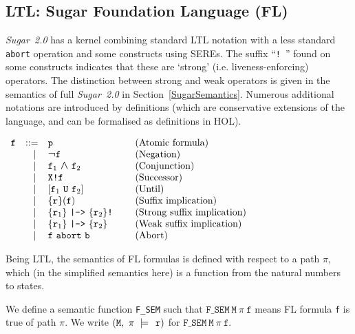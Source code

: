 \documentclass{llncs}
\renewcommand{\c}{{\hspace*{2.5mm}}}
\newcommand{\fSem}[4]{(\tt{#1,~#2~\models^{\hspace*{-2.3mm}\raisebox{1mm}{\tt#3}}~#4})}
\newcommand{\Fsem}{\texttt{F\_SEM}\xspace}
\newcommand\Sugar{{\it{Sugar~2.0}}\xspace}
\newcommand\Hol{HOL\xspace}
\renewcommand{\t}[1]{\texttt{#1}}
\newcommand{\TLNot}{\mbox{\large\bf$\neg$}}
\newcommand{\TLAnd}{\mbox{\large\bf$\wedge$}}
\begin{document}
\vspace*{-6mm}

\subsection{LTL: Sugar Foundation Language (FL)}



\Sugar has a kernel combining standard LTL notation
with a less standard \t{abort} operation and some constructs using SEREs. The suffix
``\texttt{!}~'' found on some constructs indicates
that these are `strong' (i.e. liveness-enforcing) operators.  The
distinction between strong and weak operators is given in the
semantics of full \Sugar in Section~\ref{SugarSemantics}. Numerous
additional notations are introduced by definitions (which are
conservative extensions of the language, and can be formalised as
definitions in \Hol).

\smallskip

$\begin{array}{llll}
{\t{f}} & {\rm ::=} & \t{p}
  & \mbox{\rm(Atomic formula)}\\
 & \phantom{\rm ::}\mid & \TLNot{\t{f}}
  & \mbox{\rm(Negation)}\\
 & \phantom{\rm ::}\mid & {\t{f}}_1~\TLAnd~{\t{f}}_2
  & \mbox{\rm(Conjunction)}\\
 & \phantom{\rm ::}\mid & \texttt{X!}{\t{f}}
  & \mbox{\rm(Successor)}\\
 & \phantom{\rm ::}\mid & [{\t{f}}_1~\texttt{U}~{\t{f}}_2]~~~~
  & \mbox{\rm(Until)}\\
 & \phantom{\rm ::}\mid & \{{\t{r}}\}({\t{f}})~~~~
  & \mbox{\rm(Suffix implication)}\\
 & \phantom{\rm ::}\mid & \{{\t{r}}_1\}~\texttt{|->}~\{{\t{r}}_2\}\texttt{!}~~~~
  & \mbox{\rm(Strong suffix implication)}\\
 & \phantom{\rm ::}\mid & \{{\t{r}}_1\}~\texttt{|->}~\{{\t{r}}_2\}~~~~
  & \mbox{\rm(Weak suffix implication)}\\
 & \phantom{\rm ::}\mid & \t{f}~\texttt{abort}~{\t{b}}~~~~
  & \mbox{\rm(Abort)}\\
\end{array}$

\medskip

Being LTL, the semantics of FL formulas is defined with respect to a path $\pi$,
which (in the simplified semantics here) is a function from the natural numbers to states.

We define a semantic function \Fsem such that $\Fsem~\t{M}~\pi~\t{f}$
means FL formula \t{f} is true of path $\pi$.
We write $\fSem{M}{\pi}{\c}{r}$ for $\Fsem~\t{M}~\pi~\t{f}$.
\end{document}
